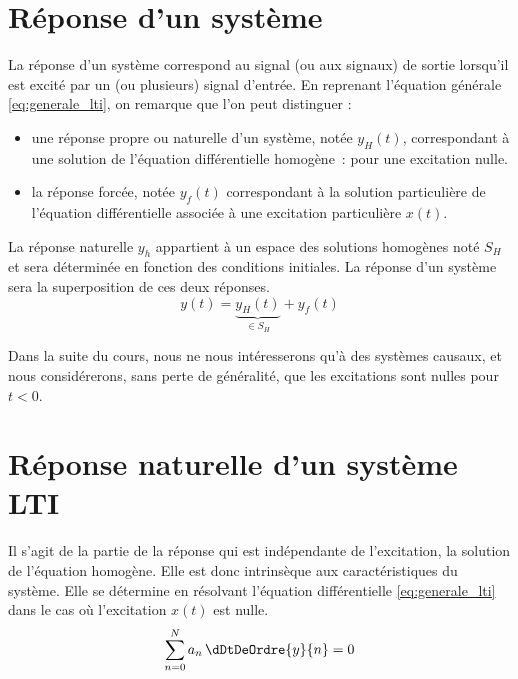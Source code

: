 \section{Réponse d'un système}
La réponse d'un système correspond au signal (ou aux signaux)
de sortie lorsqu'il est excité par un (ou plusieurs) signal
d'entrée. En reprenant l'équation générale
\ref{eq:generale_lti}, on remarque que l'on peut
distinguer :
\begin{itemize}
\item une réponse propre ou naturelle d'un système, notée
  $y_{H}(t)$, correspondant à une solution de l'équation
  différentielle homogène~: \cad{} pour une excitation nulle.
\item la réponse forcée, notée $y_{f}(t)$ correspondant à la
  solution particulière de l'équation différentielle associée
  à une excitation particulière $x(t)$.
\end{itemize}

La réponse naturelle $y_h$ appartient à un espace des
solutions homogènes noté $S_H$ et sera déterminée en fonction
des conditions initiales. La réponse d'un système sera la
superposition de ces deux réponses.
\begin{equation}
  y(t) = \underbrace{y_{H}(t)}_{\in S_H} + y_{f}(t)          
\end{equation}

Dans la suite du cours, nous ne nous intéresserons qu'à des
systèmes causaux, et nous considérerons, sans perte de
généralité, que les excitations sont nulles pour $t < 0$.

\section{Réponse naturelle d'un système LTI}
Il s'agit de la partie de la réponse qui est indépendante de
l'excitation, \cad{} la solution de l'équation homogène. Elle
est donc intrinsèque aux caractéristiques du système. Elle se
détermine en résolvant l'équation différentielle
\ref{eq:generale_lti} dans le cas où l'excitation $x(t)$ est
nulle.
\begin{equation}\label{eq:reponse_naturelle}
  \sum_{n=0}^N a_{n}\, \dDtDeOrdre{y}{n} = 0
\end{equation}

